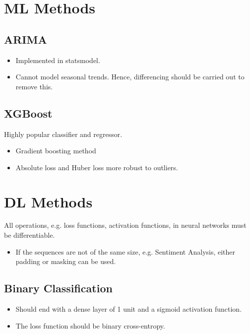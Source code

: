 \documentclass[a4paper, 12pt]{report}
\begin{document}
\chapter{ML Methods}

\section{ARIMA}
\begin{itemize}
\item Implemented in statsmodel.
\item Cannot model seasonal trends. Hence, differencing should be carried out to remove this.
\end{itemize}

\section{XGBoost}
Highly popular classifier and regressor. 
\begin{itemize}
\item Gradient boosting method
\item Absolute loss and Huber loss more robust to outliers.
\end{itemize}



\chapter{DL Methods}
All operations, e.g. loss functions, activation functions, in neural networks must be differentiable.

\begin{itemize}
\item If the sequences are not of the same size, e.g. Sentiment Analysis, either padding or masking can be used.
\end{itemize}

\section{Binary Classification}
\begin{itemize}
\item Should end with a dense layer of 1 unit and a sigmoid activation function.
\item The loss function should be binary cross-entropy.
\end{itemize}
\end{document}
